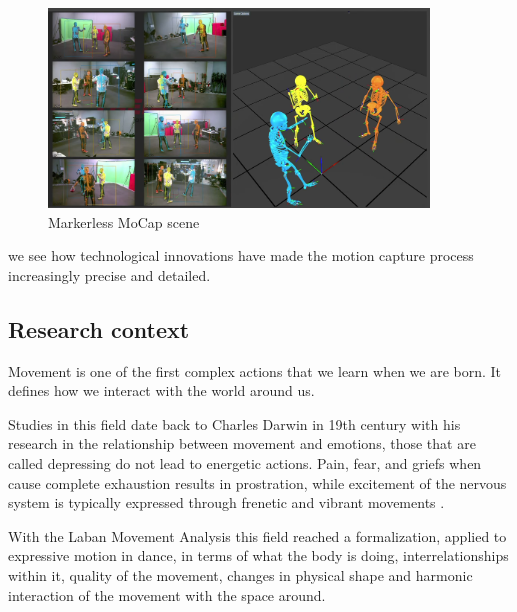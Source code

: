 \begin{figure}[H]
    \centering
    \includegraphics[width=0.9\textwidth]{graphics/MoCapMarkerlessQualisys.png}
    \caption{Markerless MoCap scene}
\end{figure}

we see how technological innovations have made the motion capture process increasingly precise and detailed.

\subsection{Research context}
Movement is one of the first complex actions that we learn when we are born. 
It defines how we interact with the world around us. 

Studies in this field date back to Charles Darwin in 19th century with his research in the relationship 
between movement and emotions, those that are called depressing do not lead to energetic actions. 
Pain, fear, and griefs when cause complete exhaustion results in prostration, 
while excitement of the nervous system is typically expressed through frenetic and vibrant movements \cite{darwin}.  

With the Laban Movement Analysis this field reached a formalization, applied to expressive motion in dance, 
in terms of what the body is doing, interrelationships within it, quality of the movement, 
changes in physical shape and harmonic interaction of the movement with the space around. 

